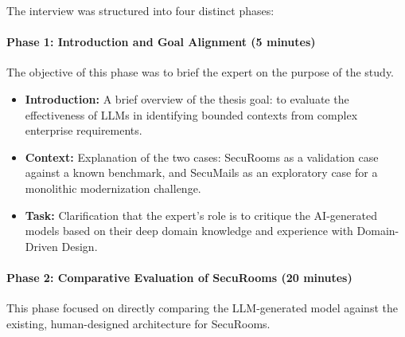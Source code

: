 The interview was structured into four distinct phases:

\paragraph{Phase 1: Introduction and Goal Alignment (5 minutes)}
The objective of this phase was to brief the expert on the purpose of the study.
\begin{itemize}
    \item \textbf{Introduction:} A brief overview of the thesis goal: to evaluate the effectiveness of LLMs in identifying bounded contexts from complex enterprise requirements.
    \item \textbf{Context:} Explanation of the two cases: SecuRooms as a validation case against a known benchmark, and SecuMails as an exploratory case for a monolithic modernization challenge.
    \item \textbf{Task:} Clarification that the expert's role is to critique the AI-generated models based on their deep domain knowledge and experience with Domain-Driven Design.
\end{itemize}

\paragraph{Phase 2: Comparative Evaluation of SecuRooms (20 minutes)}
This phase focused on directly comparing the LLM-generated model against the existing, human-designed architecture for SecuRooms.

